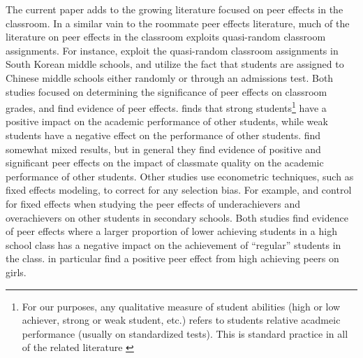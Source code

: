 \documentclass[12pt,letterpaper,english,fleqn]{article}
\begin{document}
The current paper adds to the growing literature focused on peer effects in the classroom.
In a similar vain to the roommate peer effects literature, much of the literature on peer effects in the classroom exploits quasi-random classroom assignments.
For instance, \citet{kang2007classroom} exploit the quasi-random classroom assignments in South Korean middle schools, and \citet{carman2012classroom} utilize the fact that students are assigned to Chinese middle schools either randomly or through an admissions test.
Both studies focused on determining the significance of peer effects on classroom grades, and find evidence of peer effects.
\citet{kang2007classroom} finds that strong students\footnote{For our purposes, any qualitative measure of student abilities (high or low achiever, strong or weak student, etc.) refers to students relative acadmeic performance (usually on standardized tests). This is standard practice in all of the related literature \citep{carman2012classroom,burke2013classroom,kang2007classroom,schlosser2008inside,lavy2012good}} have a positive impact on the academic performance of other students, while weak students have a negative effect on the performance of other students. 
\citet{carman2012classroom} find somewhat mixed results, but in general they find evidence of positive and significant peer effects on the impact of classmate quality on the academic performance of other students.
Other studies use econometric techniques, such as fixed effects modeling, to correct for any selection bias.
For example, \citet{schlosser2008inside} and \citet{lavy2012good} control for fixed effects when studying the peer effects of underachievers and overachievers on other students in secondary schools.
Both studies find evidence of peer effects where a larger proportion of lower achieving students in a high school class has a negative impact on the achievement of ``regular'' students in the class.
\citet{lavy2012good} in particular find a positive peer effect from high achieving peers on girls.
\end{document}
